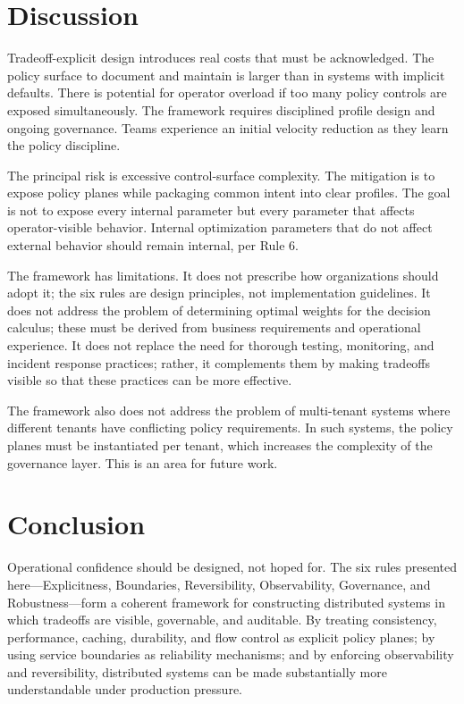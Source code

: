 \documentclass[conference]{IEEEtran}
\begin{document}
\section{Discussion}

Tradeoff-explicit design introduces real costs that must be acknowledged. The policy surface to document and maintain is larger than in systems with implicit defaults. There is potential for operator overload if too many policy controls are exposed simultaneously. The framework requires disciplined profile design and ongoing governance. Teams experience an initial velocity reduction as they learn the policy discipline.

The principal risk is excessive control-surface complexity. The mitigation is to expose policy planes while packaging common intent into clear profiles. The goal is not to expose every internal parameter but every parameter that affects operator-visible behavior. Internal optimization parameters that do not affect external behavior should remain internal, per Rule 6.

The framework has limitations. It does not prescribe how organizations should adopt it; the six rules are design principles, not implementation guidelines. It does not address the problem of determining optimal weights for the decision calculus; these must be derived from business requirements and operational experience. It does not replace the need for thorough testing, monitoring, and incident response practices; rather, it complements them by making tradeoffs visible so that these practices can be more effective.

The framework also does not address the problem of multi-tenant systems where different tenants have conflicting policy requirements. In such systems, the policy planes must be instantiated per tenant, which increases the complexity of the governance layer. This is an area for future work.

\section{Conclusion}

Operational confidence should be designed, not hoped for. The six rules presented here---Explicitness, Boundaries, Reversibility, Observability, Governance, and Robustness---form a coherent framework for constructing distributed systems in which tradeoffs are visible, governable, and auditable. By treating consistency, performance, caching, durability, and flow control as explicit policy planes; by using service boundaries as reliability mechanisms; and by enforcing observability and reversibility, distributed systems can be made substantially more understandable under production pressure.
\end{document}
